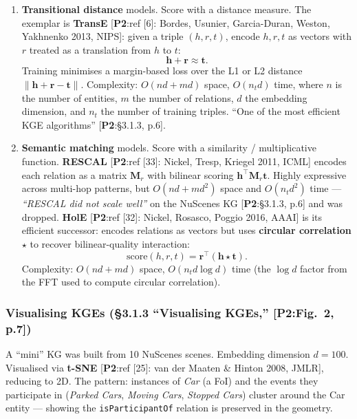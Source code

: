 \documentclass[11pt, a4paper]{article}
\newcommand{\paperref}[1]{\textcolor{srcBd}{\small[\textbf{P2}:#1]}}
\begin{document}
\begin{enumerate}
  \item \textbf{Transitional distance} models. Score with a distance measure. The exemplar is \textbf{TransE} \paperref{ref [6]: Bordes, Usunier, Garcia-Duran, Weston, Yakhnenko 2013, NIPS}: given a triple \((h, r, t)\), encode \(h, r, t\) as vectors with \(r\) treated as a translation from \(h\) to \(t\):
  \[
  \mathbf{h} + \mathbf{r} \approx \mathbf{t}.
  \]
  Training minimises a margin-based loss over the L1 or L2 distance \(\lVert \mathbf{h} + \mathbf{r} - \mathbf{t} \rVert\). Complexity: \(O(nd + md)\) space, \(O(n_t d)\) time, where \(n\) is the number of entities, \(m\) the number of relations, \(d\) the embedding dimension, and \(n_t\) the number of training triples. ``One of the most efficient KGE algorithms'' \paperref{§3.1.3, p.6}.

  \item \textbf{Semantic matching} models. Score with a similarity / multiplicative function. \textbf{RESCAL} \paperref{ref [33]: Nickel, Tresp, Kriegel 2011, ICML} encodes each relation as a matrix \(\mathbf{M}_r\) with bilinear scoring \(\mathbf{h}^\top \mathbf{M}_r \mathbf{t}\). Highly expressive across multi-hop patterns, but \(O(nd + md^2)\) space and \(O(n_t d^2)\) time — \emph{``RESCAL did not scale well''} on the NuScenes KG \paperref{§3.1.3, p.6} and was dropped. \textbf{HolE} \paperref{ref [32]: Nickel, Rosasco, Poggio 2016, AAAI} is its efficient successor: encodes relations as vectors but uses \textbf{circular correlation} \(\star\) to recover bilinear-quality interaction:
  \[
  \mathrm{score}(h, r, t) = \mathbf{r}^\top (\mathbf{h} \star \mathbf{t}).
  \]
  Complexity: \(O(nd + md)\) space, \(O(n_t d \log d)\) time (the \(\log d\) factor from the FFT used to compute circular correlation).
\end{enumerate}

\subsubsection*{Visualising KGEs (§3.1.3 ``Visualising KGEs,'' \paperref{Fig.\ 2, p.7})}
A ``mini'' KG was built from 10 NuScenes scenes. Embedding dimension \(d = 100\). Visualised via \textbf{t-SNE} \paperref{ref [25]: van der Maaten \& Hinton 2008, JMLR}, reducing to 2D. The pattern: instances of \emph{Car} (a FoI) and the events they participate in (\emph{Parked Cars}, \emph{Moving Cars}, \emph{Stopped Cars}) cluster around the Car entity — showing the \texttt{isParticipantOf} relation is preserved in the geometry.
\end{document}
